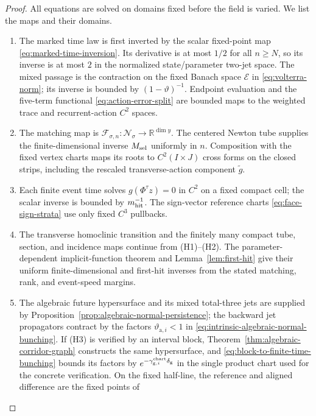 \documentclass[11pt]{amsart}
\numberwithin{equation}{section}
\theoremstyle{definition}
\theoremstyle{remark}
\newcommand{\R}{\mathbb R}
\begin{document}
\begin{proof}
All equations are solved on domains fixed before the field is varied.  We
list the maps and their domains.
\begin{enumerate}
\item The marked time law is first inverted by the scalar fixed-point map
\eqref{eq:marked-time-inversion}.  Its derivative is at most $1/2$
for all $n\ge N$, so its inverse is at most $2$ in the normalized
state/parameter two-jet space.  The mixed passage is the contraction on
the fixed Banach space $\mathcal E$ in \eqref{eq:volterra-norm}; its
inverse is bounded by $(1-\vartheta)^{-1}$.  Endpoint evaluation and the
five-term functional \eqref{eq:action-error-split} are bounded maps to the
weighted trace and recurrent-action $C^2$ spaces.
\item The matching map is
$\mathcal F_{\sigma,n}:\mathcal N_\sigma\to\R^{\dim y}$.
The centered Newton tube supplies the finite-dimensional inverse
$M_{\rm sel}$ uniformly in $n$.  Composition with the fixed vertex charts
maps its roots to $C^2(I\times J)$ cross forms on the closed strips,
including the
rescaled transverse-action component $\widetilde g$.
\item Each finite event time solves $g(\Phi^\tau z)=0$ in $C^2$ on a fixed
compact cell; the scalar inverse is bounded by $m_{\rm hit}^{-1}$.  The
sign-vector reference charts \eqref{eq:face-sign-strata} use only fixed $C^3$
pullbacks.
\item The transverse homoclinic transition and the finitely many compact
tube, section, and incidence maps continue from \textup{(H1)}--\textup{(H2)}.
The parameter-dependent implicit-function theorem and
Lemma~\ref{lem:first-hit} give their uniform finite-dimensional and
first-hit inverses from the stated matching, rank, and event-speed margins.
\item The algebraic future hypersurface and its mixed total-three jets are
supplied by Proposition~\ref{prop:algebraic-normal-persistence}; the
backward jet propagators contract by the factors
$\vartheta_{\mathrm a,i}<1$ in
\eqref{eq:intrinsic-algebraic-normal-bunching}.  If \textup{(H3)} is
verified by an interval block, Theorem~\ref{thm:algebraic-corridor-graph}
constructs the same hypersurface, and
\eqref{eq:block-to-finite-time-bunching} bounds its factors by
$e^{-\gamma^{\rm chart}_{\mathrm g,i}\delta_{\mathrm g}}$ in the single
product chart used for the concrete verification.
On the fixed half-line, the reference and
aligned difference are the fixed points of
\begin{equation*}

\end{equation*}
\end{enumerate}
\end{proof}
\end{document}
